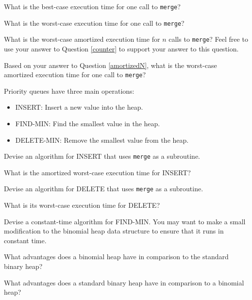 \documentclass{tufte-handout}
\begin{document}
\begin{questions}
\item What is the best-case execution time for one call to \verb|merge|?

\item What is the worst-case execution time for one call to \verb|merge|?

\item What is the worst-case amortized execution time for $n$ calls to \verb|merge|? Feel free to use your answer to Question \ref{counter} to support your answer to this question. \label{amortizedN}

\item Based on your answer to Question \ref{amortizedN}, what is the worst-case amortized execution time for one call to \verb|merge|?

\item Priority queues have three main operations:
\begin{itemize}
    \item INSERT: Insert a new value into the heap.
    \item FIND-MIN: Find the smallest value in the heap.
    \item DELETE-MIN: Remove the smallest value from the heap.
\end{itemize}

Devise an algorithm for INSERT that uses \verb|merge| as a subroutine. 

\item What is the amortized worst-case execution time for INSERT?

\item Devise an algorithm for DELETE that uses \verb|merge| as a subroutine. 

\item What is its worst-case execution time for DELETE?

\item Devise a constant-time algorithm for FIND-MIN. You may want to make a small modification to the binomial heap data structure to ensure that it runs in constant time.

\item What advantages does a binomial heap have in comparison to the standard binary heap?

\item What advantages does a standard binary heap have in comparison to a binomial heap?

\end{questions}
\end{document}
